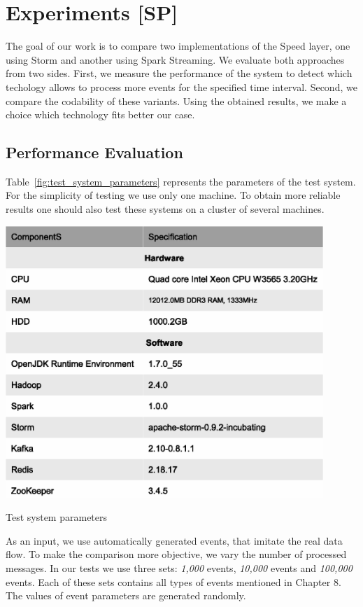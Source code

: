 \chapter{Experiments [SP]}
\label{chap:experiments}
The goal of our work is to compare two implementations of the Speed layer, one using Storm and another using Spark Streaming.
We evaluate both approaches from two sides.
First, we measure the performance of the system to detect which techology allows to process more events for the specified time interval.
Second, we compare the codability of these variants.
Using the obtained results, we make a choice which technology fits better our case.

\section{Performance Evaluation}

Table~\ref{fig:test_system_parameters} represents the parameters of the test system.
For the simplicity of testing we use only one machine.
To obtain more reliable results one should also test these systems on a cluster of several machines.

\begin{table}[h]
  \centering
  \includegraphics [width=0.9\textwidth]{images/test_system_parameters}
  \caption{Test system parameters}
  \label{fig:test_system_parameters}
\end{table}

As an input, we use automatically generated events, that imitate the real data flow.
To make the comparison more objective, we vary the number of processed messages.
In our tests we use three sets: \textit{1,000} events, \textit{10,000} events and \textit{100,000} events.
Each of these sets contains all types of events mentioned in Chapter 8.
The values of event parameters are generated randomly.

